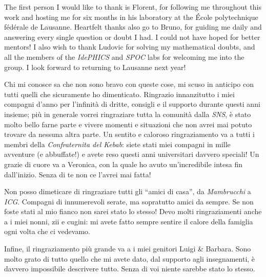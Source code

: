The first person I would like to thank is Florent, for following me throughout this work and hosting me for six months in his laboratory at the École polytechnique fédérale de Lausanne.
Heartfelt thanks also go to Bruno, for guiding me daily and answering every single question or doubt I had.
I could not have hoped for better mentors!
I also wish to thank Ludovic for solving my mathematical doubts, and all the members of the \emph{IdePHICS} and \emph{SPOC} labs for welcoming me into the group.
I look forward to returning to Lausanne next year!

Chi mi conosce sa che non sono bravo con queste cose, mi scuso in anticipo con tutti quelli
che sicuramente ho dimenticato.
Ringrazio innanzitutto i miei compagni d'anno per l'infinità di dritte, consigli e il supporto
durante questi anni insieme; più in generale vorrei ringraziare tutta la comunità dalla \emph{SNS},
è stato molto bello farne parte e vivere momenti e situazioni che non avrei mai potuto trovare da nessuna 
altra parte. Un sentito e caloroso ringraziamento va a tutti i membri della \emph{Confraternita del Kebab}:
siete stati miei compagni in mille avventure (e abbuffate!) e avete reso questi anni universitari davvero speciali!
Un grazie di cuore va a Veronica, con la quale ho avuto un'incredibile intesa fin dall'inizio.
Senza di te non ce l'avrei mai fatta!

Non posso dimeticare di ringraziare tutti gli ``amici di casa'', da \emph{Mambrucchi} a \emph{ICG}.
Compagni di innumerevoli serate, ma sopratutto amici da sempre. Se non foste stati al mio fianco non sarei stato lo stesso!
Devo molti ringraziamenti anche a i miei nonni, zii e cugini: mi avete fatto sempre sentire il calore della famiglia
ogni volta che ci vedevamo.

Infine, il ringraziamento più grande va a i miei genitori Luigi \& Barbara.
Sono molto grato di tutto quello che mi avete dato, dal supporto agli insegnamenti,
è davvero impossibile descrivere tutto. Senza di voi niente sarebbe stato lo stesso.

